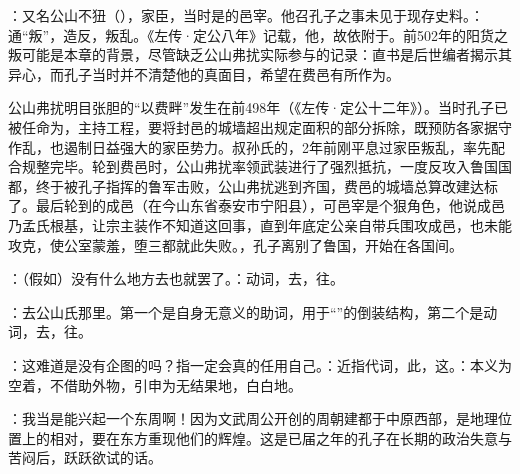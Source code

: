 {
\item {}：又名公山不狃（），家臣，当时是的邑宰。他召孔子之事未见于现存史料。：通“叛”，造反，叛乱。《左传·定公八年》记载，他，故依附于。前502年的阳货之叛可能是本章的背景，尽管缺乏公山弗扰实际参与的记录：直书是后世编者揭示其异心，而孔子当时并不清楚他的真面目，希望在费邑有所作为。%

公山弗扰明目张胆的“以费畔”发生在前498年（《左传·定公十二年》）。当时孔子已被任命为，主持工程，要将封邑的城墙超出规定面积的部分拆除，既预防各家据守作乱，也遏制日益强大的家臣势力。叔孙氏的，2年前刚平息过家臣叛乱，率先配合规整完毕。轮到费邑时，公山弗扰率领武装进行了强烈抵抗，一度反攻入鲁国国都，终于被孔子指挥的鲁军击败，公山弗扰逃到齐国，费邑的城墙总算改建达标了。最后轮到的成邑（在今山东省泰安市宁阳县），可邑宰是个狠角色，他说成邑乃孟氏根基，让宗主装作不知道这回事，直到年底定公亲自带兵围攻成邑，也未能攻克，使公室蒙羞，堕三都就此失败。，孔子离别了鲁国，开始在各国间。%

\item {}：（假如）没有什么地方去也就罢了。：动词，去，往。
\item {}：去公山氏那里。第一个是自身无意义的助词，用于“”的倒装结构，第二个是动词，去，往。
\item {}：这难道是没有企图的吗？指一定会真的任用自己。：近指代词，此，这。：本义为空着，不借助外物，引申为无结果地，白白地。
\item {}：我当是能兴起一个东周啊！因为文武周公开创的周朝建都于中原西部，是地理位置上的相对，要在东方重现他们的辉煌。这是已届之年的孔子在长期的政治失意与苦闷后，跃跃欲试的话。
}
{}


